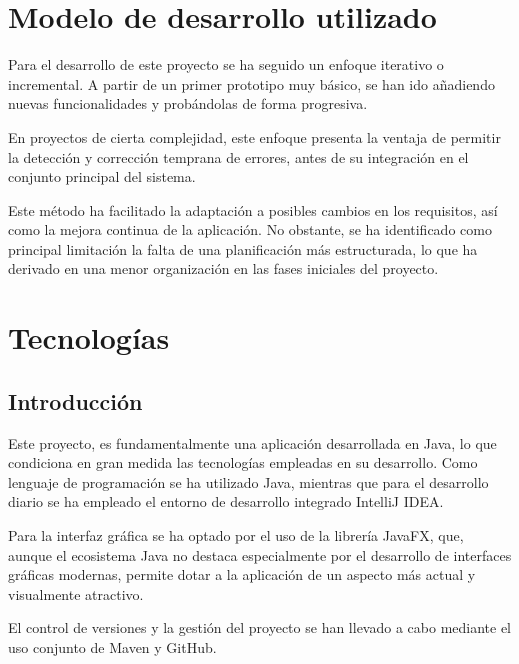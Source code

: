 \documentclass[../../main.tex]{subfiles}
\begin{document}
\section{Modelo de desarrollo utilizado}
\label{S:modelo_desarrollo}

\par{Para el desarrollo de este proyecto se ha seguido un enfoque iterativo o incremental. A partir de un primer prototipo muy básico, se han ido añadiendo nuevas funcionalidades y probándolas de forma progresiva.}

\par{En proyectos de cierta complejidad, este enfoque presenta la ventaja de permitir la detección y corrección temprana de errores, antes de su integración en el conjunto principal del sistema.}

\par{Este método ha facilitado la adaptación a posibles cambios en los requisitos, así como la mejora continua de la aplicación. No obstante, se ha identificado como principal limitación la falta de una planificación más estructurada, lo que ha derivado en una menor organización en las fases iniciales del proyecto.}

\clearpage

\section{Tecnologías}
\label{S:tecnologias}

\subsection{Introducción}

\par{Este proyecto, es fundamentalmente una aplicación desarrollada en Java, lo que condiciona en gran medida las tecnologías empleadas en su desarrollo. Como lenguaje de programación se ha utilizado Java, mientras que para el desarrollo diario se ha empleado el entorno de desarrollo integrado IntelliJ IDEA.}

\par{Para la interfaz gráfica se ha optado por el uso de la librería JavaFX, que, aunque el ecosistema Java no destaca especialmente por el desarrollo de interfaces gráficas modernas, permite dotar a la aplicación de un aspecto más actual y visualmente atractivo.}

\par{El control de versiones y la gestión del proyecto se han llevado a cabo mediante el uso conjunto de Maven y GitHub.}
\end{document}
